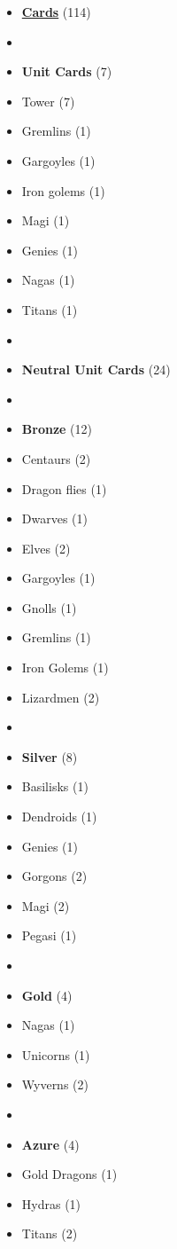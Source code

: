 \begin{multicols}{3}
\begin{itemize}[leftmargin=0pt, label={}, noitemsep, noitemsep]
  \item \textbf{\small{\underline{Cards}}} (114)
  \item
  \item \textbf{Unit Cards} (7)
  \item Tower (7)
  \item Gremlins (1)
  \item Gargoyles (1)
  \item Iron golems (1)
  \item Magi (1)
  \item Genies (1)
  \item Nagas (1)
  \item Titans (1)
  \item
  \item \textbf{Neutral Unit Cards} (24)
  \item
  \item \textbf{Bronze} (12)
  \item Centaurs (2)
  \item Dragon flies (1)
  \item Dwarves (1)
  \item Elves (2)
  \item Gargoyles (1)
  \item Gnolls (1)
  \item Gremlins (1)
  \item Iron Golems (1)
  \item Lizardmen (2)
  \item
  \item \textbf{Silver} (8)
  \item Basilisks (1)
  \item Dendroids (1)
  \item Genies (1)
  \item Gorgons (2)
  \item Magi (2)
  \item Pegasi (1)
  \item
  \item \textbf{Gold} (4)
  \item Nagas (1)
  \item Unicorns (1)
  \item Wyverns (2)
  \item
  \item \textbf{Azure} (4)
  \item Gold Dragons (1)
  \item Hydras (1)
  \item Titans (2)

\end{itemize}
\end{multicols}
